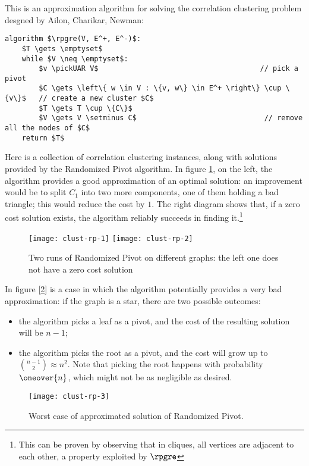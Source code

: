 This is an approximation algorithm for solving the correlation clustering problem desgned by Ailon, Charikar, Newman:
\begin{lstlisting}[caption = {Randomized Pivot algorithm}, label = {lst:clust-random-pivot}]
algorithm $\rpgre(V, E^+, E^-)$:
    $T \gets \emptyset$
    while $V \neq \emptyset$:
        $v \pickUAR V$                                      // pick a pivot 
        $C \gets \left\{ w \in V : \{v, w\} \in E^+ \right\} \cup \{v\}$   // create a new cluster $C$
        $T \gets T \cup \{C\}$
        $V \gets V \setminus C$                              // remove all the nodes of $C$
    return $T$
\end{lstlisting}

\begin{example}
    Here is a collection of correlation clustering instances, along with solutions provided by the Randomized Pivot algorithm. In figure \ref{fig:clust-rp-1}, on the left, the algorithm provides a good approximation of an optimal solution: an improvement would be to split $C_1$ into two more components, one of them holding a bad triangle; this would reduce the cost by $1$. The right diagram shows that, if a zero cost solution exists, the algorithm reliably succeeds in finding it.\footnote{This can be proven by observing that in cliques, all vertices are adjacent to each other, a property exploited by $\rpgre$}
    
    \begin{figure}[ht]
        \centering
        \texttt{[image: clust-rp-1]}
        \hspace{1pt}
        \texttt{[image: clust-rp-2]}
        \caption{Two runs of Randomized Pivot on different graphs: the left one does not have a zero cost solution}
        \label{fig:clust-rp-1}
    \end{figure}

    In figure [\ref{fig:clust-rp-3}] is a case in which the algorithm potentially provides a very bad approximation: if the graph is a star, there are two possible outcomes:
    \begin{itemize}
        \item the algorithm picks a leaf as a pivot, and the cost of the resulting solution will be $n - 1$;
        \item the algorithm picks the root as a pivot, and the cost will grow up to $\binom{n-1}{2} \approx n^2$. Note that picking the root \uar{} happens with probability $\oneover{n}$, which might not be as negligible as desired.
    \end{itemize}
    
    \begin{figure}
        \centering
        \texttt{[image: clust-rp-3]}
        \caption{Worst case of approximated solution of Randomized Pivot.}
        \label{fig:clust-rp-3}
    \end{figure}    
\end{example}

